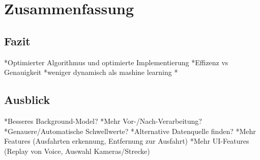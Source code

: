 \chapter{Zusammenfassung}

\section{Fazit}
*Optimierter Algorithmus und optimierte Implementierung\newline
*Effizenz vs Genauigkeit\newline
*weniger dynamisch als mashine learning\newline
*

\section{Ausblick}
*Besseres Background-Model?\newline
*Mehr Vor-/Nach-Verarbeitung?\newline
*Genauere/Automatische Schwellwerte?\newline
*Alternative Datenquelle finden?\newline
*Mehr Features (Ausfahrten erkennung, Entfernung zur Ausfahrt)\newline
*Mehr UI-Features (Replay von Voice, Auswahl Kameras/Strecke)\newline
